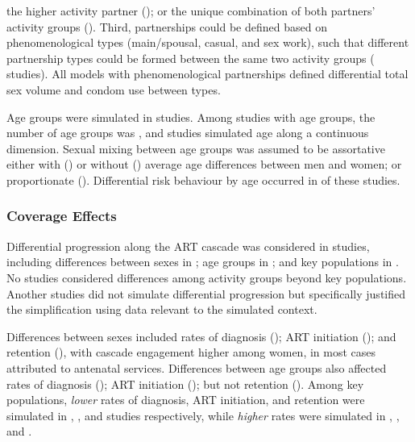 the higher activity partner (); or
the unique combination of both partners' activity groups ().
Third, partnerships could be defined based on phenomenological types 
(main/spousal, casual, and sex work), such that
different partnership types could be formed between the same two activity groups ( studies).
All models with phenomenological partnerships defined differential total sex volume and condom use between types.  %
\par
Age groups were simulated in  studies.
Among studies with age groups, the number of age groups was ,
and  studies simulated age along a continuous dimension.
Sexual mixing between age groups was assumed to be assortative
either with () or without ()
average age differences between men and women;
or proportionate ().
Differential risk behaviour by age occurred in  of these  studies.
\subsubsection{Coverage Effects}
\label{sss:res:cov}
Differential progression along the ART cascade was considered in  %
 studies, including differences between
sexes in ;
age groups in ; and
key populations in .
No studies considered differences among activity groups beyond key populations. %
Another  studies did not simulate differential progression  %
but specifically justified the simplification using data relevant to the simulated context.
\par
Differences between sexes included
rates of diagnosis ();
ART initiation (); and
retention (),
with cascade engagement higher among women,
in most cases attributed to antenatal services.
Differences between age groups also affected
rates of diagnosis ();
ART initiation ();
but not retention ().
Among key populations, \emph{lower} rates of
diagnosis, ART initiation, and retention were simulated in
, , and 
studies respectively, while \emph{higher} rates were simulated in
, , and .
